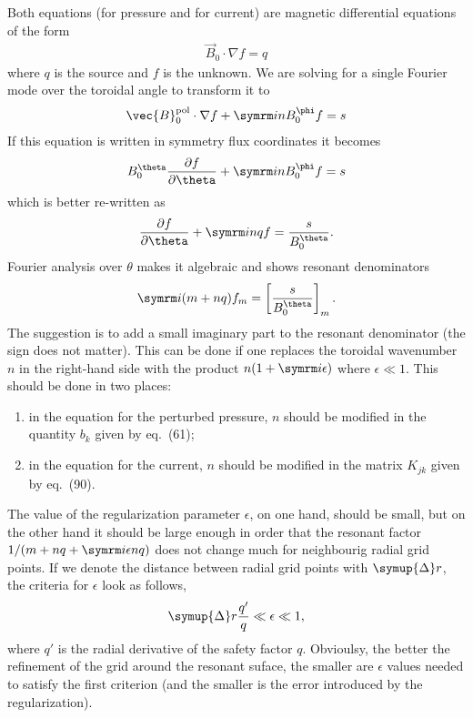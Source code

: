 Both equations (for pressure and for current) are magnetic differential equations of the form
\begin{gather*}
  \vec{B}_{0} \cdot \nabla f = q
\end{gather*}
where $q$ is the source and $f$ is the unknown. We are solving for a single Fourier mode over the toroidal angle to transform it to
\begin{gather*}
  \vec{B}_{0}^{\pol} \cdot \nabla f + \im n {B}_{0}^{\phi} f = s
\end{gather*}
If this equation is written in symmetry flux coordinates it becomes
\begin{gather*}
  B_{0}^{\theta} \pd[f]{\theta} + \im n B_{0}^{\phi} f = s
\end{gather*}
which is better re-written as
\begin{gather*}
  \pd[f]{\theta} + \im n q f = \frac{s}{B_{0}^{\theta}}.
\end{gather*}
Fourier analysis over $\theta$ makes it algebraic and shows resonant denominators
\begin{gather*}
  \im (m + n q) f_{m} = \left [ \frac{s}{B_{0}^{\theta}} \right ]_{m}.
\end{gather*}
The suggestion is to add a small imaginary part to the resonant denominator (the sign does not matter). This can be done if one replaces the toroidal wavenumber $n$ in the right-hand side with the product $n (1 + \im \epsilon)$ where $\epsilon \ll 1$. This should be done in two places:
\begin{enumerate}
\item in the equation for the perturbed pressure, $n$ should be modified in the quantity $b_{k}$ given by eq.~(61);
\item in the equation for the current, $n$ should be modified in the matrix $K_{jk}$ given by eq.~(90).
\end{enumerate}
The value of the regularization parameter $\epsilon$, on one hand, should be small, but on the other hand it should be large enough in order that the resonant factor $1 / (m + n q + \im \epsilon n q)$ does not change much for neighbourig radial grid points. If we denote the distance between radial grid points with $\symup{\Delta} r$, the criteria for $\epsilon$ look as follows,
\begin{gather*}
  \symup{\Delta} r \frac{q'}{q} \ll \epsilon \ll 1,
\end{gather*}
where $q'$ is the radial derivative of the safety factor $q$.
Obvioulsy, the better the refinement of the grid around the resonant suface, the smaller are $\epsilon$ values needed to satisfy the first criterion (and the smaller is the error introduced by the regularization).

